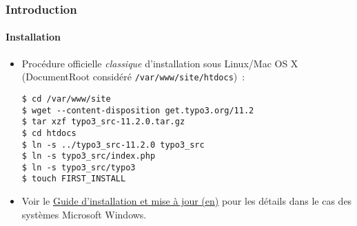 %

\begin{frame}[fragile]
	\frametitle{Introduction}
	\framesubtitle{Installation}


	\begin{itemize}
		\item Procédure officielle \textit{classique} d'installation sous Linux/Mac OS X\newline
			(DocumentRoot considéré \texttt{/var/www/site/htdocs})~:
\begin{lstlisting}
$ cd /var/www/site
$ wget --content-disposition get.typo3.org/11.2
$ tar xzf typo3_src-11.2.0.tar.gz
$ cd htdocs
$ ln -s ../typo3_src-11.2.0 typo3_src
$ ln -s typo3_src/index.php
$ ln -s typo3_src/typo3
$ touch FIRST_INSTALL
\end{lstlisting}

		\item Voir le \href{https://docs.typo3.org/m/typo3/guide-installation/master/en-us/}{Guide d'installation et mise à jour (en)}
			pour les détails dans le cas des systèmes Microsoft Windows.

	\end{itemize}
\end{frame}

